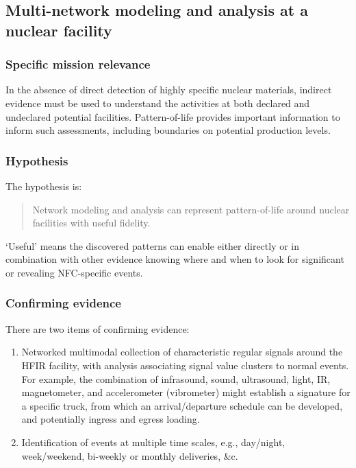\documentclass{article} %
\begin{document}
\pagebreak
\subsection{Multi-network modeling and analysis at a nuclear facility}

\subsubsection{Specific mission relevance}
In the absence of direct detection of highly specific nuclear materials, indirect evidence must be used to understand the activities at both declared and undeclared potential facilities. Pattern-of-life provides important information to inform such assessments, including boundaries on potential production levels.

\subsubsection{Hypothesis}
The hypothesis is:
\begin{quote}
Network modeling and analysis can represent pattern-of-life around nuclear facilities with useful fidelity.
\end{quote}

`Useful' means the discovered patterns can enable either directly or in combination with other evidence knowing where and when to look for significant or revealing NFC-specific events. 

\subsubsection{Confirming evidence}
There are two items of confirming evidence:
\begin{enumerate}
\item Networked multimodal collection of characteristic regular signals around the HFIR facility, with analysis associating signal value clusters to normal events. For example, the combination of infrasound, sound, ultrasound, light, IR, magnetometer, and accelerometer (vibrometer) might establish a signature for a specific truck, from which an arrival/departure schedule can be developed, and potentially ingress and egress loading. 
\item Identification of events at multiple time scales, e.g., day/night, week/weekend, bi-weekly or monthly deliveries, \&c.
\end{enumerate}
\end{document}
